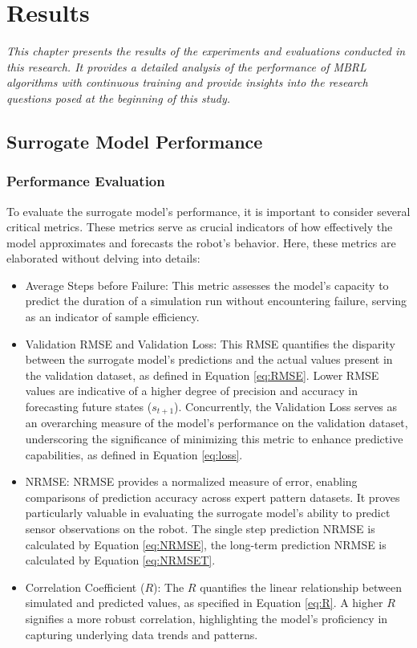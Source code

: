 \chapter{Results}
\label{chap5}
\textit{This chapter presents the results of the experiments and evaluations conducted in this research. It provides a detailed analysis of the performance of MBRL algorithms with continuous training and provide insights into the research questions posed at the beginning of this study.}

\section{Surrogate Model Performance}
\subsection{Performance Evaluation}
To evaluate the surrogate model's performance, it is important to consider several critical metrics. These metrics serve as crucial indicators of how effectively the model approximates and forecasts the robot's behavior. Here, these metrics are elaborated without delving into details:
\begin{itemize}
    \item Average Steps before Failure: This metric assesses the model's capacity to predict the duration of a simulation run without encountering failure, serving as an indicator of sample efficiency.
    \item Validation RMSE and Validation Loss: This RMSE quantifies the disparity between the surrogate model's predictions and the actual values present in the validation dataset, as defined in Equation \ref{eq:RMSE}. Lower RMSE values are indicative of a higher degree of precision and accuracy in forecasting future states ($s_{t+1}$). Concurrently, the Validation Loss serves as an overarching measure of the model's performance on the validation dataset, underscoring the significance of minimizing this metric to enhance predictive capabilities, as defined in Equation \ref{eq:loss}.
    \item NRMSE: NRMSE provides a normalized measure of error, enabling comparisons of prediction accuracy across expert pattern datasets. It proves particularly valuable in evaluating the surrogate model's ability to predict sensor observations on the robot. The single step prediction NRMSE is calculated by Equation \ref{eq:NRMSE}, the long-term prediction NRMSE is calculated by Equation \ref{eq:NRMSET}.
    \item Correlation Coefficient ($R$): The $R$ quantifies the linear relationship between simulated and predicted values, as specified in Equation \ref{eq:R}. A higher $R$ signifies a more robust correlation, highlighting the model's proficiency in capturing underlying data trends and patterns.
\end{itemize}

